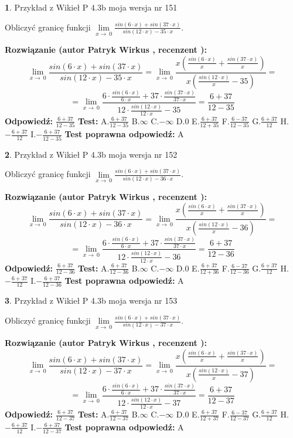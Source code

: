 \documentclass[12pt, a4paper]{article}
\theoremstyle{definition} %
\newtheorem{zad}{}
\newcommand{\zadStart}[1]{\begin{zad}#1\newline}
\newcommand{\zadStop}{\end{zad}}
\newcommand{\rozwStart}[2]{\noindent \textbf{Rozwiązanie (autor #1 , recenzent #2): }\newline}
\newcommand{\rozwStop}{\newline}
\newcommand{\odpStart}{\noindent \textbf{Odpowiedź:}\newline}
\newcommand{\odpStop}{\newline}
\newcommand{\testStart}{\noindent \textbf{Test:}\newline}
\newcommand{\testStop}{\newline}
\newcommand{\kluczStart}{\noindent \textbf{Test poprawna odpowiedź:}\newline}
\newcommand{\kluczStop}{\newline}
\begin{document}
\zadStart{Przykład z Wikieł P 4.3b moja wersja nr 151}


Obliczyć granicę funkcji $\lim\limits_{x\to\ 0}\frac{sin(6 \cdot x)+sin(37 \cdot x)}{sin(12 \cdot x)-35 \cdot x}$.
\zadStop
\rozwStart{Patryk Wirkus}{}
$$\lim\limits_{x\to\ 0}\frac{sin(6 \cdot x)+sin(37 \cdot x)}{sin(12 \cdot x)-35 \cdot x}=\lim\limits_{x\to\ 0}\frac{x(\frac{sin(6 \cdot x)}{x}+\frac{sin(37 \cdot x)}{x})}{x(\frac{sin(12 \cdot x)}{x}-35)}=$$
$$=\lim\limits_{x\to\ 0}\frac{6 \cdot \frac{sin(6 \cdot x)}{6 \cdot x}+37 \cdot \frac{sin(37 \cdot x)}{37 \cdot x}}{12 \cdot \frac{sin(12 \cdot x)}{12 \cdot x}-35}=\frac{6+37}{12-35}$$
\rozwStop
\odpStart
$\frac{6+37}{12-35}$
\odpStop
\testStart
A.$\frac{6+37}{12-35}$
B.$\infty$
C.$-\infty$
D.$0$
E.$\frac{6+37}{12+35}$
F.$\frac{6-37}{12-35}$
G.$\frac{6+37}{12}$
H.$-\frac{6+37}{12}$
I.$-\frac{6+37}{12-35}$
\testStop
\kluczStart
A
\kluczStop



\zadStart{Przykład z Wikieł P 4.3b moja wersja nr 152}


Obliczyć granicę funkcji $\lim\limits_{x\to\ 0}\frac{sin(6 \cdot x)+sin(37 \cdot x)}{sin(12 \cdot x)-36 \cdot x}$.
\zadStop
\rozwStart{Patryk Wirkus}{}
$$\lim\limits_{x\to\ 0}\frac{sin(6 \cdot x)+sin(37 \cdot x)}{sin(12 \cdot x)-36 \cdot x}=\lim\limits_{x\to\ 0}\frac{x(\frac{sin(6 \cdot x)}{x}+\frac{sin(37 \cdot x)}{x})}{x(\frac{sin(12 \cdot x)}{x}-36)}=$$
$$=\lim\limits_{x\to\ 0}\frac{6 \cdot \frac{sin(6 \cdot x)}{6 \cdot x}+37 \cdot \frac{sin(37 \cdot x)}{37 \cdot x}}{12 \cdot \frac{sin(12 \cdot x)}{12 \cdot x}-36}=\frac{6+37}{12-36}$$
\rozwStop
\odpStart
$\frac{6+37}{12-36}$
\odpStop
\testStart
A.$\frac{6+37}{12-36}$
B.$\infty$
C.$-\infty$
D.$0$
E.$\frac{6+37}{12+36}$
F.$\frac{6-37}{12-36}$
G.$\frac{6+37}{12}$
H.$-\frac{6+37}{12}$
I.$-\frac{6+37}{12-36}$
\testStop
\kluczStart
A
\kluczStop



\zadStart{Przykład z Wikieł P 4.3b moja wersja nr 153}


Obliczyć granicę funkcji $\lim\limits_{x\to\ 0}\frac{sin(6 \cdot x)+sin(37 \cdot x)}{sin(12 \cdot x)-37 \cdot x}$.
\zadStop
\rozwStart{Patryk Wirkus}{}
$$\lim\limits_{x\to\ 0}\frac{sin(6 \cdot x)+sin(37 \cdot x)}{sin(12 \cdot x)-37 \cdot x}=\lim\limits_{x\to\ 0}\frac{x(\frac{sin(6 \cdot x)}{x}+\frac{sin(37 \cdot x)}{x})}{x(\frac{sin(12 \cdot x)}{x}-37)}=$$
$$=\lim\limits_{x\to\ 0}\frac{6 \cdot \frac{sin(6 \cdot x)}{6 \cdot x}+37 \cdot \frac{sin(37 \cdot x)}{37 \cdot x}}{12 \cdot \frac{sin(12 \cdot x)}{12 \cdot x}-37}=\frac{6+37}{12-37}$$
\rozwStop
\odpStart
$\frac{6+37}{12-37}$
\odpStop
\testStart
A.$\frac{6+37}{12-37}$
B.$\infty$
C.$-\infty$
D.$0$
E.$\frac{6+37}{12+37}$
F.$\frac{6-37}{12-37}$
G.$\frac{6+37}{12}$
H.$-\frac{6+37}{12}$
I.$-\frac{6+37}{12-37}$
\testStop
\kluczStart
A
\kluczStop
\end{document}
